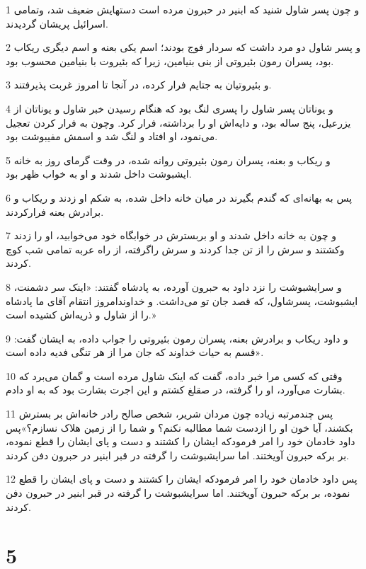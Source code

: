 \par 1 و چون پسر شاول شنید که ابنیر در حبرون مرده است دستهایش ضعیف شد، وتمامی اسرائیل پریشان گردیدند.
\par 2 و پسر شاول دو مرد داشت که سردار فوج بودند؛ اسم یکی بعنه و اسم دیگری ریکاب بود، پسران رمون بئیروتی از بنی بنیامین، زیرا که بئیروت با بنیامین محسوب بود.
\par 3 و بئیروتیان به جتایم فرار کرده، در آنجا تا امروز غربت پذیرفتند.
\par 4 و یوناتان پسر شاول را پسری لنگ بود که هنگام رسیدن خبر شاول و یوناتان از یزرعیل، پنج ساله بود، و دایه‌اش او را برداشته، فرار کرد. وچون به فرار کردن تعجیل می‌نمود، او افتاد و لنگ شد و اسمش مفیبوشت بود.
\par 5 و ریکاب و بعنه، پسران رمون بئیروتی روانه شده، در وقت گرمای روز به خانه ایشبوشت داخل شدند و او به خواب ظهر بود.
\par 6 پس به بهانه‌ای که گندم بگیرند در میان خانه داخل شده، به شکم او زدند و ریکاب و برادرش بعنه فرارکردند.
\par 7 و چون به خانه داخل شدند و او بربسترش در خوابگاه خود می‌خوابید، او را زدند وکشتند و سرش را از تن جدا کردند و سرش راگرفته، از راه عربه تمامی شب کوچ کردند.
\par 8 و سرایشبوشت را نزد داود به حبرون آورده، به پادشاه گفتند: «اینک سر دشمنت، ایشبوشت، پسرشاول، که قصد جان تو می‌داشت. و خداوندامروز انتقام آقای ما پادشاه را از شاول و ذریه‌اش کشیده است.»
\par 9 و داود ریکاب و برادرش بعنه، پسران رمون بئیروتی را جواب داده، به ایشان گفت: «قسم به حیات خداوند که جان مرا از هر تنگی فدیه داده است.
\par 10 وقتی که کسی مرا خبر داده، گفت که اینک شاول مرده است و گمان می‌برد که بشارت می‌آورد، او را گرفته، در صقلغ کشتم و این اجرت بشارت بود که به او دادم.
\par 11 پس چندمرتبه زیاده چون مردان شریر، شخص صالح رادر خانه‌اش بر بسترش بکشند، آیا خون او را ازدست شما مطالبه نکنم؟ و شما را از زمین هلاک نسازم؟»پس داود خادمان خود را امر فرمودکه ایشان را کشتند و دست و پای ایشان را قطع نموده، بر برکه حبرون آویختند. اما سرایشبوشت را گرفته در قبر ابنیر در حبرون دفن کردند.
\par 12 پس داود خادمان خود را امر فرمودکه ایشان را کشتند و دست و پای ایشان را قطع نموده، بر برکه حبرون آویختند. اما سرایشبوشت را گرفته در قبر ابنیر در حبرون دفن کردند.
 
\chapter{5}

